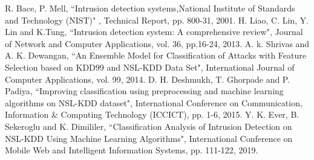 \documentclass[conference]{IEEEtran}
\begin{document}
\begin{thebibliography}{00}
 R. Bace, P. Mell, ``Intrusion detection systems,National Institute of Standards and
Technology (NIST)" , Technical Report, pp. 800-31, 2001.
 H. Liao, C. Lin, Y. Lin and K.Tung, ``Intrusion detection system: A comprehensive review", Journal of Network and Computer Applications, vol. 36, pp.16-24, 2013.
 A. k. Shrivas and A. K. Dewangan, ``An Ensemble Model for Classification of Attacks with Feature Selection based on KDD99 and
NSL-KDD Data Set", International Journal of Computer Applications, vol. 99, 2014.
 D. H. Deshmukh, T. Ghorpade and P. Padiya, ``Improving classification using preprocessing and machine learning algorithms on NSL-KDD dataset", International Conference on Communication, Information & Computing Technology (ICCICT), pp. 1-6, 2015.
 Y. K. Ever, B. Sekeroglu and K. Dimililer, ``Classification Analysis of Intrusion Detection on NSL-KDD Using Machine Learning Algorithms", International Conference on Mobile Web and Intelligent Information Systems, pp. 111-122, 2019.
\end{thebibliography}
\end{document}
